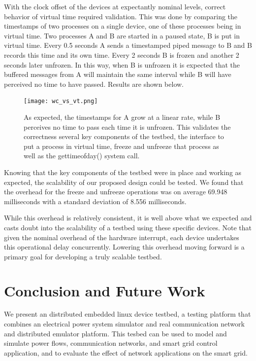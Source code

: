 With the clock offset of the devices at expectantly nominal levels, correct behavior of virtual time required validation. This was done by comparing the timestamps of two processes on a single device, one of these processes being in virtual time. Two processes A and B are started in a paused state, B is put in virtual time. Every 0.5 seconds A sends a timestamped piped message to B and B records this time and its own time. Every 2 seconds B is frozen and another 2 seconds later unfrozen. In this way, when B is unfrozen it is expected that the buffered messages from A will maintain the same interval while B will have perceived no time to have passed. Results are shown below.

\begin{figure}[H]
  \texttt{[image: wc\_vs\_vt.png]}
  \label{sim-err}

  \caption{As expected, the timestamps for A grow at a linear rate, while B perceives no time to pass each time it is unfrozen. This validates the correctness several key components of the testbed, the interface to put a process in virtual time, freeze and unfreeze that process as well as the gettimeofday() system call.
    }
\end{figure}

Knowing that the key components of the testbed were in place and working as expected, the scalability of our proposed design could be tested. We found that the overhead for the freeze and unfreeze operations was on average 69.948 milliseconds with a standard deviation of 8.556 milliseconds. 

While this overhead is relatively consistent, it is well above what we expected and casts doubt into the scalability of a testbed using these specific devices. Note that given the nominal overhead of the hardware interrupt, each device undertakes this operational delay concurrently. Lowering this overhead moving forward is a primary goal for developing a truly scalable testbed.

\section{Conclusion and Future Work}
We present an distributed embedded linux device testbed, a testing platform that combines an
electrical power system simulator and real communication network and distributed emulator platform. This tesbed can be used to model and simulate power flows, communication networks, and smart grid control application, and to evaluate the effect of network applications on the smart grid. 

